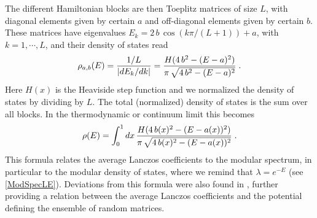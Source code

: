 \documentclass[aps,prl,twocolumn,showpacs,preprintnumbers,amsmath,amssymb]{revtex4-1}
\def\frac#1#2{{#1\over #2}}
\def\be{\begin{equation}}
\def\ee{\end{equation}}
\begin{document}
The different Hamiltonian blocks are then Toeplitz matrices of size $L$, with diagonal elements given by certain $a$ and off-diagonal elements given by certain $b$. These matrices have eigenvalues $E_k=2\,b\,\cos (k\pi/(L+1)) +a $, with $k=1,\cdots, L$, and their density of states read
\be \label{rhoseg}
\rho_{a,b}(E)=\frac{1/L}{|dE_k/dk|}= \frac{H(4\,b^2-(E-a)^2)}{\pi\,\sqrt{4\,b^2-(E-a)^2}}\;.
\ee
Here $H(x)$ is the Heaviside step function and we normalized the density of states by dividing by $L$. The total (normalized) density of states is the sum over all blocks. In the thermodynamic or continuum limit this becomes \cite{Balasubramanian:2022dnj}
\be \label{intdl}
\rho(E) =  \int_0^1 dx\, \frac{H(4\,b(x)^2-(E-a(x))^2)}{\pi\, \sqrt{4\,b(x)^2-(E-a(x))^2}}\;.
\ee
This formula relates the average Lanczos coefficients to the modular spectrum, in particular to the modular density of states, where we remind that $\lambda=e^{-E}$ (see \eqref{ModSpecLE}). Deviations from this formula were also found in \cite{Balasubramanian:2022dnj}, further providing a relation between the average Lanczos coefficients and the potential defining the ensemble of random matrices.
\end{document}
